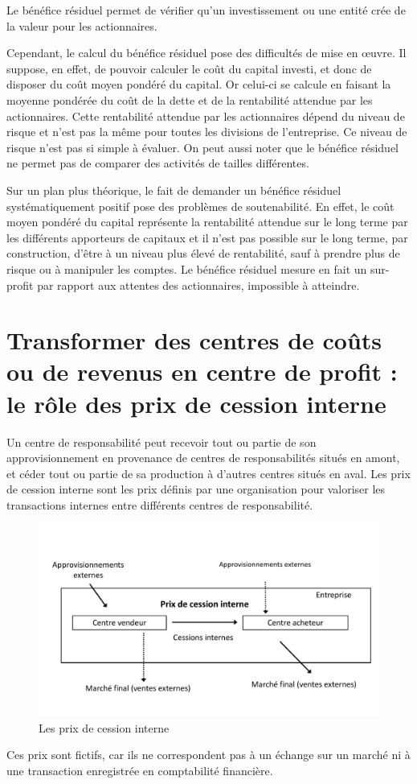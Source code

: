 \documentclass[oneside]{kaobook}
\begin{document}
Le bénéfice résiduel permet de vérifier qu'un investissement ou une entité crée de la valeur pour les actionnaires. 

Cependant, le calcul du bénéfice résiduel pose des difficultés de mise en œuvre. Il suppose, en effet, de pouvoir calculer le coût du capital investi, et donc de disposer du coût moyen pondéré du capital. Or celui-ci se calcule en faisant la moyenne pondérée du coût de la dette et de la rentabilité attendue par les actionnaires. Cette rentabilité attendue par les actionnaires dépend du niveau de risque et n'est pas la même pour toutes les divisions de l'entreprise. Ce niveau de risque n'est pas si simple à évaluer. On peut aussi noter que le bénéfice résiduel ne permet pas de comparer des activités de tailles différentes.

Sur un plan plus théorique, le fait de demander un bénéfice résiduel systématiquement positif pose des problèmes de soutenabilité. En effet, le coût moyen pondéré du capital représente la rentabilité attendue sur le long terme par les différents apporteurs de capitaux et il n'est pas possible sur le long terme, par construction, d'être à un niveau plus élevé de rentabilité, sauf à prendre plus de risque ou à manipuler les comptes. Le bénéfice résiduel mesure en fait un sur-profit par rapport aux attentes des actionnaires, impossible à atteindre.

\section{Transformer des centres de coûts ou de revenus en centre de profit : le rôle des prix de cession interne}
\label{sec:org75a2066}
Un centre de responsabilité peut recevoir tout ou partie de son approvisionnement en provenance de centres de responsabilités situés en amont, et céder tout ou partie de sa production à d’autres centres situés en aval. Les prix de cession interne sont les prix définis par une organisation pour valoriser les transactions internes entre différents centres de responsabilité.

\begin{figure}[H]

\includegraphics{./img/pci.pdf}
\caption{Les prix de cession interne}
\end{figure}
Ces prix sont fictifs, car ils ne correspondent pas à un échange sur un marché ni à une transaction enregistrée en comptabilité financière.
\end{document}
